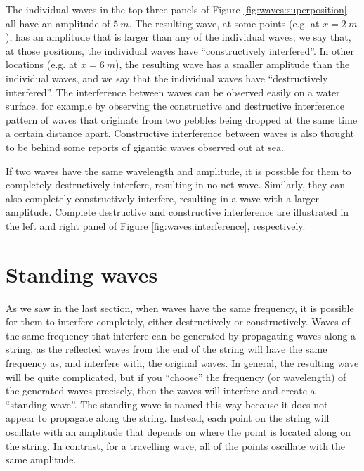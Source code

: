 The individual waves in the top three panels of Figure \ref{fig:waves:superposition} all have an amplitude of $\SI{5}{m}$. The resulting wave, at some points (e.g. at $x=\SI{2}{m}$), has an amplitude that is larger than any of the individual waves; we say that, at those positions, the individual waves have ``constructively interfered''. In other locations (e.g. at $x=\SI{6}{m}$), the resulting wave has a smaller amplitude than the individual waves, and we say that the individual waves have ``destructively interfered''. The interference between waves can be observed easily on a water surface, for example by observing the constructive and destructive interference pattern of waves that originate from two pebbles being dropped at the same time a certain distance apart. Constructive interference between waves is also thought to be behind some reports of gigantic waves observed out at sea.

If two waves have the same wavelength and amplitude, it is possible for them to completely destructively interfere, resulting in no net wave. Similarly, they can also completely constructively interfere, resulting in a wave with a larger amplitude. Complete destructive and constructive interference are illustrated in the left and right panel of Figure \ref{fig:waves:interference}, respectively.
\newpage
{}

\section{Standing waves}
As we saw in the last section, when waves have the same frequency, it is possible for them to interfere completely, either destructively or constructively. Waves of the same frequency that interfere can be generated by propagating waves along a string, as the reflected waves from the end of the string will have the same frequency as, and interfere with, the original waves. In general, the resulting wave will be quite complicated, but if you ``choose'' the frequency (or wavelength) of the generated waves precisely, then the waves will interfere and create a ``standing wave''. The standing wave is named this way because it does not appear to propagate along the string. Instead, each point on the string will oscillate with an amplitude that depends on where the point is located along on the string. In contrast, for a travelling wave, all of the points oscillate with the same amplitude.

